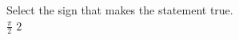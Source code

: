 \documentclass{ximera}
\author{David Kish}
\begin{document}
\begin{exercise}
Select the sign that makes the statement true.\\
$\frac{\pi}{2}$ \wordChoice{\choice[correct]{$<$}\choice{$>$}\choice{$=$}} $2$ 

\end{exercise}
\end{document}
